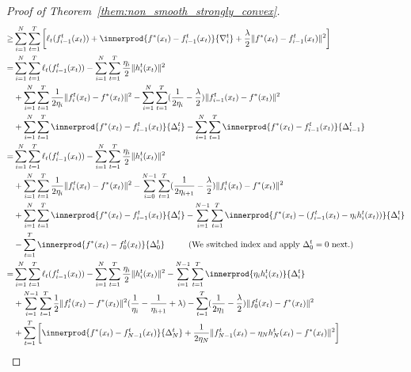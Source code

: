 \begin{proof}[Proof of Theorem~\ref{them:non_smooth_strongly_convex}]
\begin{align}
\geq& \sum _{i=1}^N \sum _{t=1}^T \left[\ell_t (f^t_{i-1}(x_t)) 
    +\innerprod{f^*(x_t) - f^t_{i-1}(x_t)}{\nabla _{i}^t} 
    +\frac{\lambda}{2} \Vert f^*(x_t) - f^t_{i-1}(x_t) \Vert^2 \right]\\
=& \sum _{i=1}^N \sum _{t=1}^T\ell_t (f^t_{i-1}(x_t)) 
    -\sum _{i=1}^N \sum _{t=1}^T \frac{\eta_i}{2} \Vert h^t_i(x_t) \Vert^2 
\nonumber \\
&   + \sum _{i=1}^N \sum _{t=1}^T 
        \frac{1}{2\eta_i} \Vert f^t_{i}(x_t) - f^*(x_t) \Vert^2 
    - \sum _{i=1}^N \sum _{t=1}^T 
        (\frac{1}{2\eta_i} - \frac{\lambda}{2}) \Vert f^t_{i-1}(x_t) - f^*(x_t) \Vert^2
\nonumber \\
&   +\sum _{i=1}^N \sum _{t=1}^T 
        \innerprod{ f^*(x_t) - f^t_{i-1}(x_t) }{\Delta_{i}^t} 
    -\sum _{i=1}^N \sum _{t=1}^T 
        \innerprod{f^*(x_t) - f^t_{i-1}(x_t)}{\Delta_{i-1}^t} \\
=& \sum _{i=1}^N \sum _{t=1}^T\ell_t (f^t_{i-1}(x_t)) 
    -\sum _{i=1}^N \sum _{t=1}^T \frac{\eta_i}{2} \Vert h^t_i(x_t) \Vert^2 
\nonumber \\
&   + \sum _{i=1}^N \sum _{t=1}^T 
        \frac{1}{2\eta_i} \Vert f^t_{i}(x_t) - f^*(x_t) \Vert^2 
    - \sum _{i=0}^{N-1} \sum _{t=1}^T 
        (\frac{1}{2\eta_{i+1}} - \frac{\lambda}{2}) \Vert f^t_{i}(x_t) - f^*(x_t) \Vert^2
\nonumber \\
&   + \sum _{i=1}^N \sum _{t=1}^T 
        \innerprod{ f^*(x_t) - f^t_{i-1}(x_t) }{\Delta_{i}^t} 
    - \sum _{i=1}^{N-1} \sum _{t=1}^T 
        \innerprod{f^*(x_t) - (f^t_{i-1}(x_t) - \eta_i h^t_i(x_t))}{\Delta_{i}^t} 
\nonumber \\
&   - \sum_{t=1}^T \innerprod{f^*(x_t) - f^t_{0}(x_t)}{\Delta_{0}^t} 
    \;\;\;\;\;\;\;\;\;\text{   (We switched index and apply $\Delta_0^t = 0$ next.)}\\
=& \sum _{i=1}^N \sum _{t=1}^T\ell_t (f^t_{i-1}(x_t)) 
    -\sum _{i=1}^N \sum _{t=1}^T \frac{\eta_i}{2} \Vert h^t_i(x_t) \Vert^2 
    - \sum_{i=1}^{N-1} \sum_{t=1}^T 
        \innerprod{\eta_i h^t_i(x_t)}{\Delta_{i}^t} 
\nonumber \\
&   + \sum _{i=1}^{N-1} \sum _{t=1}^T 
        \frac{1}{2} \Vert f^t_{i}(x_t) - f^*(x_t) \Vert^2
            (\frac{1}{\eta_{i}} - \frac{1}{\eta_{i+1}} + \lambda)
    - \sum_{t=1}^T (\frac{1}{2\eta_1} - \frac{\lambda}{2}) \Vert f^t_{0}(x_t) - f^*(x_t) \Vert^2
\nonumber \\
&   + \sum_{t=1}^T 
        \left[\innerprod{f^*(x_t) - f^t_{N-1}(x_t)}{\Delta_{N}^t} 
        + \frac{1}{2\eta_N} \Vert f_{N-1}^t(x_t) - \eta_N h_N^t(x_t) - f^*(x_t) \Vert^2 \right] \\

\end{align}
\end{proof}
